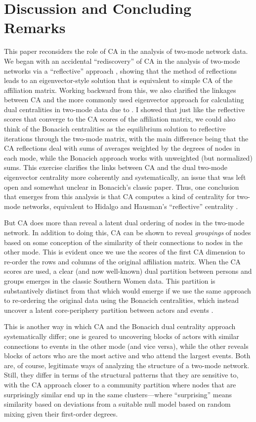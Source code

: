 \documentclass[a4paper,fleqn]{cas-sc}
\begin{document}
\section{Discussion and Concluding Remarks} \label{sec:disc}
This paper reconsiders the role of CA in the analysis of two-mode network data. We began with an accidental ``rediscovery'' of CA in the analysis of two-mode networks via a ``reflective'' approach \citep{hidalgo2009building}, showing that the method of reflections leads to an eigenvector-style solution that is equivalent to simple CA of the affiliation matrix. Working backward from this, we also clarified the linkages between CA and the more commonly used eigenvector approach for calculating dual centralities in two-mode data due to \citet{bonacich1991simultaneous}. I showed that just like the reflective scores that converge to the CA scores of the affiliation matrix, we could also think of the Bonacich centralities as the equilibrium solution to reflective iterations through the two-mode matrix, with the main difference being that the CA reflections deal with sums of averages weighted by the degrees of nodes in each mode, while the Bonacich approach works with unweighted (but normalized) sums. This exercise clarifies the links between CA and the dual two-mode eigenvector centrality more coherently and systematically, an issue that was left open and somewhat unclear in Bonacich's \citeyearpar{bonacich1991simultaneous} classic paper. Thus, one conclusion that emerges from this analysis is that CA computes a kind of centrality for two-mode networks, equivalent to Hidalgo and Hausman's ``reflective'' centrality \citep{van2021correspondence}.

But CA does more than reveal a latent dual ordering of nodes in the two-mode network. In addition to doing this, CA can be shown to reveal \textit{groupings} of nodes based on some conception of the similarity of their connections to nodes in the other mode. This is evident once we use the scores of the first CA dimension to re-order the rows and columns of the original affiliation matrix. When the CA scores are used, a clear (and now well-known) dual partition between persons and groups emerges in the classic Southern Women data. This partition is substantively distinct from that which would emerge if we use the same approach to re-ordering the original data using the Bonacich centralities, which instead uncover a latent core-periphery partition between actors and events \citep{everett2013dual}. 

This is another way in which CA and the Bonacich dual centrality approach systematically differ; one is geared to uncovering blocks of actors with similar connections to events in the other mode (and vice versa), while the other reveals blocks of actors who are the most active and who attend the largest events. Both are, of course, legitimate ways of analyzing the structure of a two-mode network. Still, they differ in terms of the structural patterns that they are sensitive to, with the CA approach closer to a community partition where nodes that are surprisingly similar end up in the same clusters---where ``surprising'' means similarity based on deviations from a suitable null model based on random mixing given their first-order degrees. 
\end{document}
